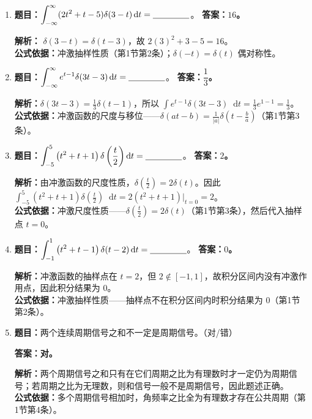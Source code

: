 \documentclass[12pt,a4paper]{ctexart}
\newcommand{\dif}{\mathop{}\!\mathrm{d}}
\begin{document}
\begin{enumerate}[label=\arabic*.]
\item \textbf{题目：}\(\displaystyle \int_{-\infty}^{\infty}(2t^2+t-5)\delta(3-t)\dif t=\underline{\hspace{1.5cm}}\)。
\textbf{答案：$16$。}\par
\textbf{解析：} $\delta(3-t)=\delta(t-3)$，故 \(\displaystyle 2(3)^2+3-5=16\)。\\
\textbf{公式依据：}冲激抽样性质（第1节第2条）；$\delta(-t)=\delta(t)$ 偶对称性。

\item \textbf{题目：}\(\displaystyle \int_{-\infty}^{\infty} e^{t-1}\delta(3t-3)\dif t=\underline{\hspace{1.5cm}}\)。
\textbf{答案：$\dfrac13$。}\par
\textbf{解析：}\(\displaystyle \delta(3t-3)=\frac13\delta(t-1)\)，所以 \(\displaystyle \int e^{t-1}\delta(3t-3)\dif t=\frac13e^{1-1}=\frac13\)。\\
\textbf{公式依据：}冲激函数的尺度与移位——$\displaystyle\delta(at-b)=\frac1{|a|}\delta\!\left(t-\frac ba\right)$（第1节第3条）。

\item \textbf{题目：}\(\displaystyle \int_{-5}^{5}\left(t^2+t+1\right)\delta\left(\frac{t}{2}\right)\dif t=\underline{\hspace{1.5cm}}\)。
\textbf{答案：$2$。}\par
\textbf{解析：}由冲激函数的尺度性质，\(\displaystyle \delta\left(\frac{t}{2}\right)=2\delta(t)\)。因此 \(\displaystyle \int_{-5}^{5}\left(t^2+t+1\right)\delta\left(\frac{t}{2}\right)\dif t=2\left(t^2+t+1\right)\big|_{t=0}=2\)。\\
\textbf{公式依据：}冲激尺度性质——$\displaystyle\delta\!\left(\frac t2\right)=2\delta(t)$（第1节第3条），然后代入抽样点 $t=0$。

\item \textbf{题目：}\(\displaystyle \int_{-1}^{1}\left(t^2+t-1\right)\delta(t-2)\dif t=\underline{\hspace{1.5cm}}\)。
\textbf{答案：$0$。}\par
\textbf{解析：}冲激函数的抽样点在 $t=2$，但 $2\notin[-1,1]$，故积分区间内没有冲激作用点，因此积分结果为 $0$。\\
\textbf{公式依据：}冲激抽样性质——抽样点不在积分区间内时积分结果为 $0$（第1节第2条）。

\item \textbf{题目：}两个连续周期信号之和不一定是周期信号。（对/错）\par
\textbf{答案：对。}\par
\textbf{解析：}两个周期信号之和只有在它们周期之比为有理数时才一定仍为周期信号；若周期之比为无理数，则和信号一般不是周期信号，因此题述正确。\\
\textbf{公式依据：}多个周期信号相加时，角频率之比全为有理数才存在公共周期（第1节第4条）。


\end{enumerate}
\end{document}
